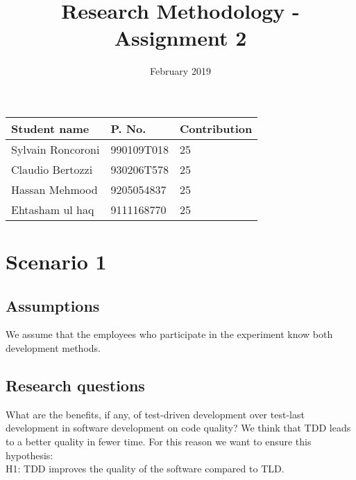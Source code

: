 \documentclass{article}
\title{Research Methodology - Assignment 2}
\date{February 2019}
\begin{document}
\maketitle

\begin{tabular}{|l|l|l|}
\hline
     \textbf{Student name} & \textbf{P. No.} & \textbf{Contribution} \\
     \hline
     Sylvain Roncoroni & 990109T018 & 25\\
     Claudio Bertozzi & 930206T578 & 25\\
     Hassan Mehmood & 9205054837 & 25\\
     Ehtasham ul haq & 9111168770 & 25\\
     \hline
\end{tabular}


\section{Scenario 1}
\subsection{Assumptions}
We assume that the employees who participate in the experiment know both development methods.

\subsection{Research questions}
What are the benefits, if any, of test-driven development over test-last development in software development on code quality?
We think that TDD leads to a better quality in fewer time. For this reason we want to ensure this hypothesis: \\
H1: TDD improves the quality of the software compared to TLD.
\end{document}
